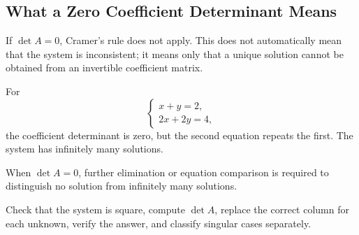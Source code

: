 \subsection{What a Zero Coefficient Determinant Means}

If $\det A=0$, Cramer's rule does not apply. This does not automatically mean that the system is inconsistent; it means only that a unique solution cannot be obtained from an invertible coefficient matrix.

\begin{examplebox}
For
\[
\begin{cases}
x+y=2,\\
2x+2y=4,
\end{cases}
\]
the coefficient determinant is zero, but the second equation repeats the first. The system has infinitely many solutions.
\end{examplebox}

\begin{corebox}
When $\det A=0$, further elimination or equation comparison is required to distinguish no solution from infinitely many solutions.
\end{corebox}

\begin{summarybox}
Check that the system is square, compute $\det A$, replace the correct column for each unknown, verify the answer, and classify singular cases separately.
\end{summarybox}
